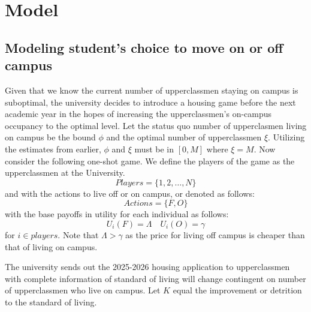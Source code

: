 \documentclass[12pt]{article}
\begin{document}
\section{Model}
\subsection{Modeling student's choice to move on or off campus}
Given that we know the current number of upperclassmen staying on campus is suboptimal, the university decides to introduce a housing game before the next academic year in the hopes of increasing the upperclassmen's on-campus occupancy to the optimal level. Let the status quo number of upperclasmen living on campus be the bound $\phi$ and the optimal number of upperclassmen $\xi$. Utilizing the estimates from earlier, $\phi$ and $\xi$ must be in $[0,M]$ where $\xi = M$. Now consider the following one-shot game. We define the players of the game as the upperclassmen at the University.
\[
Players = \{1, 2, \dots, N \}
\]
and with the actions to live off or on campus, or denoted as follows:
\[
Actions = \{F, O\}
\]
with the base payoffs in utility for each individual as follows:
\[
U_i(F) = \Lambda \quad U_i(O) = \gamma
\]
for $i \in players$. Note that $\Lambda > \gamma$ as the price for living off campus is cheaper than that of living on campus. 

The university sends out the 2025-2026 housing application to upperclassmen with complete information of standard of living will change contingent on number of upperclassmen who live on campus. Let $K$ equal the improvement or detrition to the standard of living. 
\end{document}
